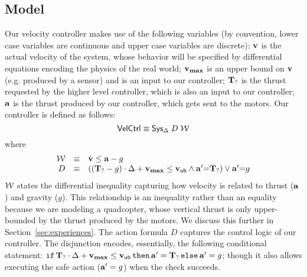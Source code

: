 \subsection{Model}
Our velocity controller makes use of the following variables (by
convention, lower case variables are continuous and upper case variables
are discrete): $\mathbf{v}$ is the actual velocity of the system, whose behavior
will be specified by differential equations encoding the physics of the
real world; $\mathbf{v_{max}}$ is an upper bound on $\mathbf{v}$ (e.g. produced by a sensor)
and is an input to our controller; $\mathbf{T_{?}}$ is the thrust requested by the
higher level controller, which is also an input to our controller; $\mathbf{a}$ is the
thrust produced by our controller, which gets sent to the motors. Our controller is
defined as follows:
\[
{\textsf{VelCtrl}} \equiv {\textsf{Sys}}{}_{\Delta}\;D\;\mathcal{W}
\]
where
\[
\begin{array}{rcl}
\mathcal{W} & \equiv & \dot{\mathbf{v}}\leq\mathbf{a} - g \\
D & \equiv & ((\mathbf{T_{?}}-g)\cdot\Delta + \mathbf{v_{max}} \leq \mathsf{\mathbf{v}_{ub}} \wedge \mathbf{a}{}^\prime {=} \mathbf{T_{?}}) \vee \mathbf{a}{}^\prime {=} g
\end{array}
\]
$\mathcal{W}$ states the differential inequality capturing how velocity is related
to thrust ($\mathbf{a}$) and gravity ($g$).  This relationship is an inequality
rather than an equality because we are modeling a quadcopter, whose
vertical thrust is only upper-bounded by the thrust produced by the motors.
We discuss this further in Section~\ref{sec:experiences}.  The action
formula $D$ captures the control logic of our controller.  The disjunction
encodes, essentially, the following conditional statement:
$\texttt{if}\,\mathbf{T_{?}} \cdot \Delta + \mathbf{v_{max}} \leq
\mathsf{\mathbf{v}_{ub}}\,\texttt{then}\,\mathbf{a}{}^\prime = \mathbf{T_{?}}\,\texttt{else}\,\mathbf{a}{}^\prime =
g$; though it also allows executing the safe action ($\mathbf{a}{}^\prime = g$)
when the check succeeds.

